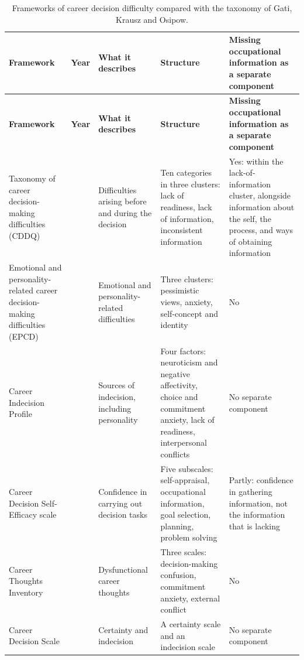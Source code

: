 {\small{}\renewcommand{\arraystretch}{1.1}
\begin{longtable}{|>{\raggedright\arraybackslash}p{}|>{\raggedright\arraybackslash}p{}|>{\raggedright\arraybackslash}p{}|>{\raggedright\arraybackslash}p{}|>{\raggedright\arraybackslash}p{}|}
\caption{Frameworks of career decision difficulty compared with the taxonomy of Gati, Krausz and Osipow.} \\
\hline
\textbf{Framework} & \textbf{Year} & \textbf{What it describes} & \textbf{Structure} & \textbf{Missing occupational information as a separate component} \\ \hline
\endfirsthead
\hline
\textbf{Framework} & \textbf{Year} & \textbf{What it describes} & \textbf{Structure} & \textbf{Missing occupational information as a separate component} \\ \hline
\endhead
Taxonomy of career decision-\allowbreak{}making difficulties (CDDQ)\cite{r1} & 1996 & Difficulties arising before and during the decision & Ten categories in three clusters: lack of readiness, lack of information, inconsistent information & Yes: within the lack-\allowbreak{}of-\allowbreak{}information cluster, alongside information about the self, the process, and ways of obtaining information \\ \hline
Emotional and personality-\allowbreak{}related career decision-\allowbreak{}making difficulties (EPCD)\cite{r106} & 2008 & Emotional and personality-\allowbreak{}related difficulties & Three clusters: pessimistic views, anxiety, self-\allowbreak{}concept and identity & No \\ \hline
Career Indecision Profile\cite{r107} & 2013 & Sources of indecision, including personality & Four factors: neuroticism and negative affectivity, choice and commitment anxiety, lack of readiness, interpersonal conflicts & No separate component \\ \hline
Career Decision Self-\allowbreak{}Efficacy scale\cite{r108} & 1983 & Confidence in carrying out decision tasks & Five subscales: self-\allowbreak{}appraisal, occupational information, goal selection, planning, problem solving & Partly: confidence in gathering information, not the information that is lacking \\ \hline
Career Thoughts Inventory\cite{r109} & 1996 & Dysfunctional career thoughts & Three scales: decision-\allowbreak{}making confusion, commitment anxiety, external conflict & No \\ \hline
Career Decision Scale\cite{r110} & 1976 & Certainty and indecision & A certainty scale and an indecision scale & No separate component \\ \hline
\end{longtable}
}
